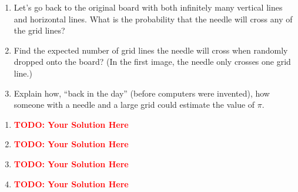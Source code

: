 \documentclass[12pt]{article}
\def\todo#1{\textcolor{red}{\textbf{#1}}}
\renewcommand{\|}{\mid}
\begin{document}
\begin{enumerate}
\begin{enumerate}
    \item  Let's go back to the original board with both infinitely many vertical lines and horizontal lines. What is the probability that the needle will cross any of the grid lines?
    \item Find the expected number of grid lines the needle will cross when randomly dropped onto the board? (In the first image, the needle only crosses one grid line.) 
    \item Explain how, ``back in the day'' (before computers were invented), how someone with a needle and a large grid could estimate the value of $\pi$.
\end{enumerate}

\begin{tcolorbox}
\begin{enumerate}
\item \todo{TODO: Your Solution Here}
\item \todo{TODO: Your Solution Here}
\item \todo{TODO: Your Solution Here}
\item \todo{TODO: Your Solution Here}
\end{enumerate}
\end{tcolorbox}

\end{enumerate}
\end{document}
